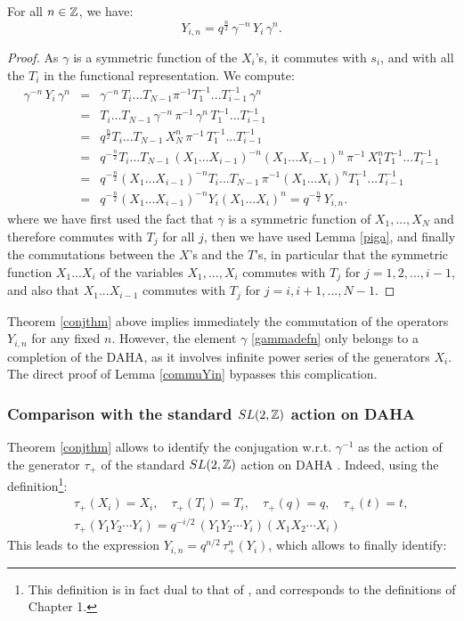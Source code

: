 \begin{thm}\label{conjthm}
For all $n\in {\mathbb Z}$, we have:
$$Y_{i,n}=q^{\frac{n}{2}}\,\gamma^{-n}\,Y_i \, \gamma^n.$$
\end{thm}
\begin{proof}
As $\gamma$ is a symmetric function of the $X_i$'s, it commutes with $s_i$,
and with all the $T_i$ in the functional representation. 
We compute:
\begin{eqnarray*}
\gamma^{-n}\,Y_i \, \gamma^n&=&\gamma^{-n}\,T_i... T_{N-1} \pi^{-1}T_1^{-1}...T_{i-1}^{-1}\, \gamma^n\\
&=&T_i... T_{N-1}\, \gamma^{-n}\,\pi^{-1}\, \gamma^n\, T_1^{-1}...T_{i-1}^{-1}\\
&=& q^{\frac{n}{2}}T_i... T_{N-1}\, X_{N}^n\,\pi^{-1}\,  T_1^{-1}...T_{i-1}^{-1}\\
&=&q^{-\frac{n}{2}}T_i... T_{N-1}\, (X_1...X_{i-1})^{-n} (X_1...X_{i-1})^n\,\pi^{-1}\, X_{1}^n T_1^{-1}...T_{i-1}^{-1}\\
&=&q^{-\frac{n}{2}}(X_1...X_{i-1})^{-n}T_i... T_{N-1}\, \pi^{-1}(X_1...X_{i})^nT_1^{-1}...T_{i-1}^{-1}\\
&=&q^{-\frac{n}{2}}(X_1...X_{i-1})^{-n}Y_i(X_1...X_i)^n=q^{-\frac{n}{2}}\, Y_{i,n}.
\end{eqnarray*}
where we have first used the fact that $\gamma$ is a symmetric function of $X_1,...,X_{N}$ 
and therefore commutes with $T_j$ for all $j$, then we have used Lemma \ref{piga}, and 
finally the commutations between the $X$'s and the $T$'s,
in particular that the symmetric function $X_1...X_i$ of the variables $X_1,...,X_i$ commutes with $T_j$
for $j=1,2,...,i-1$, and also that $X_1...X_{i-1}$ commutes with $T_j$ for $j=i,i+1,...,N-1$.
\end{proof}

\begin{remark}
Theorem \ref{conjthm} above implies immediately the commutation  of the operators $Y_{i,n}$ for any fixed $n$.
However, the element $\gamma$ \eqref{gammadefn} only belongs to a completion of the DAHA, as it involves infinite power series of the generators $X_i$. The direct proof of Lemma \ref{commuYin} bypasses this complication.
\end{remark}

\subsubsection{Comparison with the standard $SL(2,{\mathbb Z})$ action on DAHA}


Theorem \ref{conjthm} allows to identify the conjugation w.r.t. $\gamma^{-1}$ as the action 
of the generator $\tau_+$ of the standard $SL(2,{\mathbb Z})$ action on DAHA \cite{Cheredbook}. 
Indeed, using the definition\footnote{This definition is in fact dual to that of \cite{Cheredbook},
and corresponds to the definitions of Chapter 1.}:
\begin{eqnarray*}&&\tau_+(X_i)=X_i, \quad \tau_+(T_i)=T_i, \quad \tau_+(q)=q, \quad \tau_+(t)=t, \\
&& \tau_+(Y_1Y_2\cdots Y_i)=q^{-i/2}\, (Y_1 Y_2 \cdots Y_i)( X_1 X_2 \cdots X_i) 
\end{eqnarray*}
This leads to the expression $Y_{i,n}=q^{n/2}\, \tau_+^n (Y_i)$, which allows to finally identify:

